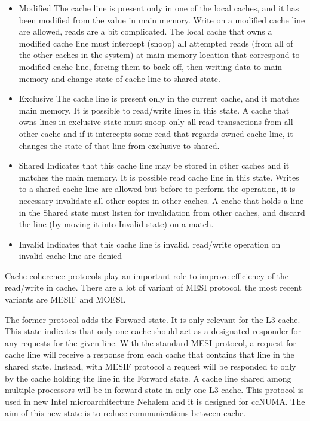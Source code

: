 \begin{itemize}

\item Modified
The cache line is present only in one of the local caches, and it has been modified from the value in main memory. Write on a modified cache line are 
allowed, reads are a bit complicated. The local cache that owns a modified cache line must intercept (snoop) all attempted reads (from all of the other 
caches in the system) at main memory location that correspond to modified cache line, forcing them to back off, then writing data to main memory and change
state of cache line to shared state.
 
\item Exclusive
The cache line is present only in the current cache, and it matches main memory. It is possible to read/write lines in this state. A cache that owns
lines in exclusive state must snoop only all read transactions from all other cache and if it intercepts some read that regards owned cache line, it changes
the state of that line from exclusive to shared.

\item Shared
Indicates that this cache line may be stored in other caches and it matches the main memory. It is possible read cache line in this state. Writes to a 
shared cache line are allowed but before to perform the operation, it is necessary invalidate all other copies in other caches.
A cache that holds a line in the Shared state must listen for invalidation from other caches, and discard the line (by moving it into Invalid state) on a 
match.

\item Invalid
Indicates that this cache line is invalid, read/write operation on invalid cache line are denied

\end{itemize}

Cache coherence protocols play an important role to improve efficiency of the read/write in cache. There are a lot of variant of MESI protocol, the most 
recent variants are MESIF and MOESI.

The former protocol adds the Forward state. It is only relevant for the L3 cache. This state indicates that only one cache should act as a designated 
responder for any requests for the given line. With the standard MESI protocol, a request for cache line will receive a response from each cache that 
contains that line in the shared state. Instead, with MESIF protocol a request will be responded to only by the cache holding the line in the Forward state.
A cache line shared among multiple processors will be in forward state in only one L3 cache. This protocol is used in new Intel microarchitecture Nehalem 
and it is designed for ccNUMA. The aim of this new state is to reduce communications between cache.

